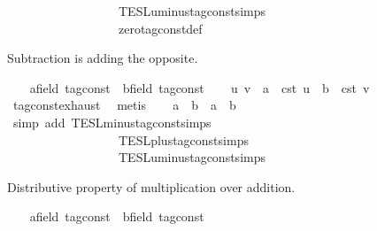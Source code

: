 \begin{isabellebody}
\ \ \ \ \ \ \ \ \ \ \ \ \ \ \ \ \ \ TESL{\isachardot}uminus{\isacharunderscore}tag{\isacharunderscore}const{\isachardot}simps\isanewline
\ \ \ \ \ \ \ \ \ \ \ \ \ \ \ \ \ \ zero{\isacharunderscore}tag{\isacharunderscore}const{\isacharunderscore}def{\isacharparenright}\isanewline
{}\isamarkupfalse%
%
\begin{isamarkuptext}%
Subtraction is adding the opposite.%
\end{isamarkuptext}\isamarkuptrue%
\ \ \isamarkupfalse%
\ a{\isacharcolon}{\isacharcolon}{\isacartoucheopen}{\isacharprime}{\isasymtau}{\isacharcolon}{\isacharcolon}field\ tag{\isacharunderscore}const{\isacartoucheclose}\ \ b{\isacharcolon}{\isacharcolon}{\isacartoucheopen}{\isacharprime}{\isasymtau}{\isacharcolon}{\isacharcolon}field\ tag{\isacharunderscore}const{\isacartoucheclose}\isanewline
\ \ \isamarkupfalse%
\ u\ v\ \ {\isacartoucheopen}a\ {\isacharequal}\ {\isasymtau}\isactrlsub c\isactrlsub s\isactrlsub t\ u{\isacartoucheclose}\ \ {\isacartoucheopen}b\ {\isacharequal}\ {\isasymtau}\isactrlsub c\isactrlsub s\isactrlsub t\ v{\isacartoucheclose}\ \isamarkupfalse%
\ tag{\isacharunderscore}const{\isachardot}exhaust\ \isamarkupfalse%
\ metis\isanewline
\ \ \isamarkupfalse%
\ {\isacartoucheopen}a\ {\isacharminus}\ b\ {\isacharequal}\ a\ {\isacharplus}\ {\isacharminus}b{\isacartoucheclose}\isanewline
\ \ \ \ \isamarkupfalse%
\ {\isacharparenleft}simp\ add{\isacharcolon}\ TESL{\isachardot}minus{\isacharunderscore}tag{\isacharunderscore}const{\isachardot}simps\isanewline
\ \ \ \ \ \ \ \ \ \ \ \ \ \ \ \ \ \ TESL{\isachardot}plus{\isacharunderscore}tag{\isacharunderscore}const{\isachardot}simps\isanewline
\ \ \ \ \ \ \ \ \ \ \ \ \ \ \ \ \ \ TESL{\isachardot}uminus{\isacharunderscore}tag{\isacharunderscore}const{\isachardot}simps{\isacharparenright}\isanewline
{}\isamarkupfalse%
%
\begin{isamarkuptext}%
Distributive property of multiplication over addition.%
\end{isamarkuptext}\isamarkuptrue%
\ \ \isamarkupfalse%
\ a{\isacharcolon}{\isacharcolon}{\isacartoucheopen}{\isacharprime}{\isasymtau}{\isacharcolon}{\isacharcolon}field\ tag{\isacharunderscore}const{\isacartoucheclose}\ \ b{\isacharcolon}{\isacharcolon}{\isacartoucheopen}{\isacharprime}{\isasymtau}{\isacharcolon}{\isacharcolon}field\ tag{\isacharunderscore}const{\isacartoucheclose}\isanewline

\end{isabellebody}
